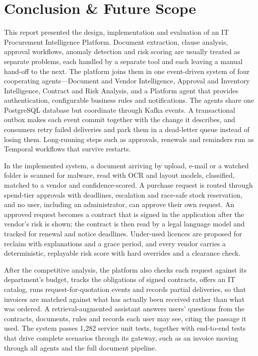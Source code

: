 
\chapter{Conclusion \& Future Scope} \label{chap6}
\newpage

This report presented the design, implementation and evaluation of an IT Procurement Intelligence Platform. Document extraction, clause analysis, approval workflows, anomaly detection and risk scoring are usually treated as separate problems, each handled by a separate tool and each leaving a manual hand-off to the next. The platform joins them in one event-driven system of four cooperating agents---Document and Vendor Intelligence, Approval and Inventory Intelligence, Contract and Risk Analysis, and a Platform agent that provides authentication, configurable business rules and notifications. The agents share one PostgreSQL database but coordinate through Kafka events. A transactional outbox makes each event commit together with the change it describes, and consumers retry failed deliveries and park them in a dead-letter queue instead of losing them. Long-running steps such as approvals, renewals and reminders run as Temporal workflows that survive restarts.

In the implemented system, a document arriving by upload, e-mail or a watched folder is scanned for malware, read with OCR and layout models, classified, matched to a vendor and confidence-scored. A purchase request is routed through spend-tier approvals with deadlines, escalation and race-safe stock reservation, and no user, including an administrator, can approve their own request. An approved request becomes a contract that is signed in the application after the vendor's risk is shown; the contract is then read by a legal language model and tracked for renewal and notice deadlines. Under-used licences are proposed for reclaim with explanations and a grace period, and every vendor carries a deterministic, replayable risk score with hard overrides and a clearance check.

After the competitive analysis, the platform also checks each request against its department's budget, tracks the obligations of signed contracts, offers an IT catalog, runs request-for-quotation events and records partial deliveries, so that invoices are matched against what has actually been received rather than what was ordered. A retrieval-augmented assistant answers users' questions from the contracts, documents, rules and records each user may see, citing the passage it used. The system passes 1,282 service unit tests, together with end-to-end tests that drive complete scenarios through its gateway, such as an invoice moving through all agents and the full document pipeline.

